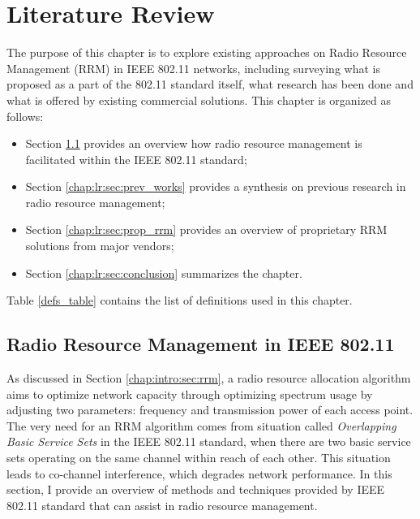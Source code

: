 \chapter{Literature Review}
\label{chap:lr}
\chaptermark{}
The purpose of this chapter is to explore existing approaches on Radio Resource Management (RRM) in IEEE 802.11 networks, including surveying what is proposed as a part of the 802.11 standard itself, what research has been done and what is offered by existing commercial solutions. This chapter is organized as follows:
\begin{itemize}
    \item Section \ref{chap:lr:sec:rrm_80211} provides an overview how radio resource management is facilitated within the IEEE 802.11 standard;
    \item Section \ref{chap:lr:sec:prev_works} provides a synthesis on previous research in radio resource management;
    \item Section \ref{chap:lr:sec:prop_rrm} provides an overview of proprietary RRM solutions from major vendors;
    \item Section \ref{chap:lr:sec:conclusion} summarizes the chapter.
\end{itemize}
Table \ref{defs_table} contains the list of definitions used in this chapter.

\section {Radio Resource Management in IEEE 802.11}
\label{chap:lr:sec:rrm_80211}
As discussed in Section \ref{chap:intro:sec:rrm}, a radio resource allocation algorithm aims to optimize network capacity through optimizing spectrum usage by adjusting two parameters: frequency and transmission power of each access point. The very need for an RRM algorithm comes from situation called \textit{Overlapping Basic Service Sets} in the IEEE 802.11 standard, when there are two basic service sets operating on the same channel within reach of each other. This situation leads to co-channel interference, which degrades network performance. In this section, I provide an overview of methods and techniques provided by IEEE 802.11 standard that can assist in radio resource management.


